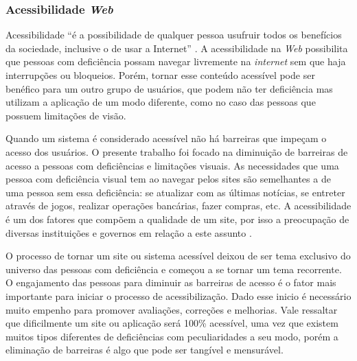 \subsubsection{Acessibilidade \textit{Web}}
{
Acessibilidade “é a possibilidade de qualquer pessoa usufruir todos os benefícios da sociedade, inclusive o de usar a Internet” \cite{Ferreira_2015}. A acessibilidade na \textit{Web} possibilita que pessoas com deficiência possam navegar livremente na \textit{internet} sem que haja interrupções ou bloqueios. Porém, tornar esse conteúdo acessível pode ser benéfico para um outro grupo de usuários, que podem não ter deficiência mas utilizam a aplicação de um modo diferente, como no caso das pessoas que possuem limitações de visão. 

Quando um sistema é considerado acessível não há barreiras que impeçam o acesso dos usuários. O presente trabalho foi focado na diminuição de barreiras de acesso a pessoas com deficiências e limitações visuais. As necessidades que uma pessoa com deficiência visual tem ao navegar pelos sites são semelhantes a de uma pessoa sem essa deficiência: se atualizar com as últimas notícias, se entreter através de jogos, realizar operações bancárias, fazer compras, etc. A acessibilidade é um dos fatores que compõem a qualidade de um site, por isso a preocupação de diversas instituições e governos em relação a este assunto \cite{sbqs}.

O processo de tornar um site ou sistema acessível deixou de ser tema exclusivo do universo das pessoas com deficiência e começou a se tornar um tema recorrente. O engajamento das pessoas para diminuir as barreiras de acesso é o fator mais importante para iniciar o processo de acessibilização. Dado esse inicio é necessário muito empenho para promover avaliações, correções e melhorias. Vale ressaltar que dificilmente um site ou aplicação será 100\% acessível, uma vez que existem muitos tipos diferentes de deficiências com peculiaridades a seu modo, porém a eliminação de barreiras é algo que pode ser tangível e mensurável. 
}
 

